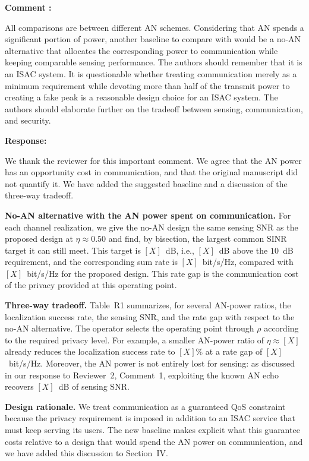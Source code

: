 \documentclass[a4paper,12pt]{article}
\newcounter{reviewcomment}
\newenvironment{reviewcomment}{%
  \stepcounter{reviewcomment}%
  \begin{shaded}
  \textbf{Comment \thereviewcomment:}\par
}{\end{shaded}}
\newenvironment{response}{\par\textbf{Response:}\par}{\par}
\begin{document}
\begin{reviewcomment}
All comparisons are between different AN schemes. Considering that AN
spends a significant portion of power, another baseline to compare with
would be a no-AN alternative that allocates the corresponding power to
communication while keeping comparable sensing performance. The authors
should remember that it is an ISAC system. It is questionable whether
treating communication merely as a minimum requirement while devoting more
than half of the transmit power to creating a fake peak is a reasonable
design choice for an ISAC system. The authors should elaborate further on
the tradeoff between sensing, communication, and security.
\end{reviewcomment}
\begin{response}
We thank the reviewer for this important comment. We agree that the AN
power has an opportunity cost in communication, and that the original
manuscript did not quantify it. We have added the suggested baseline and a
discussion of the three-way tradeoff.

\textbf{No-AN alternative with the AN power spent on communication.} For
each channel realization, we give the no-AN design the same sensing SNR as
the proposed design at $\eta\approx0.50$ and find, by bisection, the
largest common SINR target it can still meet. This target is $[X]$~dB,
i.e., $[X]$~dB above the $10$~dB requirement, and the corresponding sum
rate is $[X]$~bit/s/Hz, compared with $[X]$~bit/s/Hz for the proposed
design. This rate gap is the communication cost of the privacy provided
at this operating point.

\textbf{Three-way tradeoff.} Table~R1 summarizes, for several AN-power
ratios, the localization success rate, the sensing SNR, and the rate gap
with respect to the no-AN alternative. The operator selects the operating
point through $\rho$ according to the required privacy level. For example,
a smaller AN-power ratio of $\eta\approx[X]$ already reduces the
localization success rate to $[X]\%$ at a rate gap of
$[X]$~bit/s/Hz. Moreover, the AN power is not entirely lost for sensing:
as discussed in our response to Reviewer~2, Comment~1, exploiting the known
AN echo recovers $[X]$~dB of sensing SNR.

\textbf{Design rationale.} We treat communication as a guaranteed QoS
constraint because the privacy requirement is imposed in addition to an
ISAC service that must keep serving its users. The new baseline makes
explicit what this guarantee costs relative to a design that would spend
the AN power on communication, and we have added this discussion to
Section~IV.


\end{response}
\end{document}
